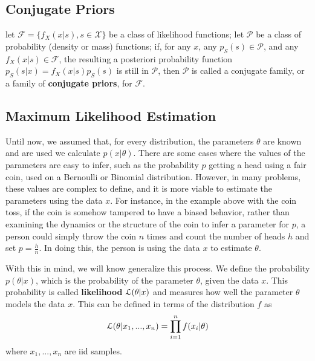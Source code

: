 \subsection{Conjugate Priors}
\begin{definition}
let $\mathcal{F}= \{f_{X}(x|s), s \in \mathcal{X}\}$ be a class of likelihood functions; let $\mathcal{P}$ be a class
of probability (density or mass) functions; if, for any $x$, any $p_{S}(s) \in \mathcal{P}$, and any $f_{X}(x|s) \in \mathcal{F}$,
the resulting a posteriori probability function $p_{S}(s|x) = f_{X}(x|s)p_{S}(s)$ is still in $\mathcal{P}$, then $\mathcal{P}$ is 
called a conjugate family, or a family of {\bf conjugate priors}, for $\mathcal{F}$.
\end{definition}

\subsection{Maximum Likelihood Estimation}
Until now, we assumed that, for every distribution, the parameters $\theta$ are known and are used we calculate $p(x|\theta)$.
There are some cases where the values of the parameters are easy to infer, such as the probability $p$ getting a head using a fair coin, used on a Bernoulli or Binomial distribution.
However, in many problems, these values are complex to define, and it is more viable to estimate the parameters using the data $x$. 
For instance, in the example above with the coin toss, if the coin is somehow tampered to have a biased behavior, 
rather than examining the dynamics or the structure of the coin to infer a parameter for $p$, 
a person could simply throw the coin $n$ times and count the number of heads $h$ and set $p=\frac{h}{n}$. In doing this, the person is using the data $x$ to estimate $\theta$.

With this in mind, we will know generalize this process. We define the probability $p(\theta|x)$, which is the probability of the parameter $\theta$, given the data $x$. 
This probability is called {\bf likelihood} $\mathcal{L}(\theta|x)$ and measures how well the parameter $\theta$ models the data $x$. This can be defined in terms of the distribution $f$ as
\begin{equation*}
\mathcal{L}(\theta|x_1,...,x_n)=\prod_{i=1}^n f(x_i|\theta)
\end{equation*}
where $x_1,...,x_n$ are iid samples.

